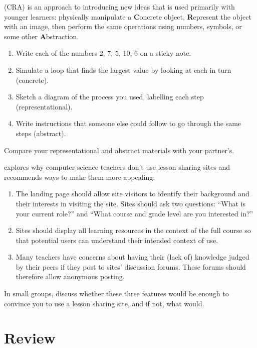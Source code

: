 
 (CRA)
is an approach to introducing new ideas
that is used primarily with younger learners:
physically manipulate a \textbf{C}oncrete object,
\textbf{R}epresent the object with an image,
then perform the same operations
using numbers, symbols, or some other \textbf{A}bstraction.

\begin{enumerate}

\item
  Write each of the numbers 2, 7, 5, 10, 6 on a sticky note.

\item
  Simulate a loop that finds the largest value by looking at each in turn (concrete).

\item
  Sketch a diagram of the process you used,
  labelling each step (representational).

\item
  Write instructions that someone else could follow
  to go through the same steps (abstract).
\end{enumerate}

Compare your representational and abstract materials with your partner's.


\cite{Leak2017} explores why computer science teachers don't use lesson sharing sites
and recommends ways to make them more appealing:

\begin{enumerate}

\item
  The landing page should allow site visitors to identify their background and their interests in visiting the site.
  Sites should ask two questions:
  ``What is your current role?'' and
  ``What course and grade level are you interested in?''

\item
   Sites should display all learning resources in the context of the full course
   so that potential users can understand their intended context of use.

\item
  Many teachers have concerns about having their (lack of) knowledge judged by their peers
  if they post to sites' discussion forums.
  These forums should therefore allow anonymous posting.

\end{enumerate}

In small groups,
discuss whether these three features would be enough to convince you to use a lesson sharing site,
and if not,
what would.

\section*{Review}

